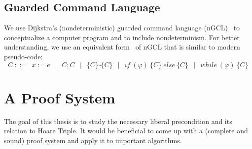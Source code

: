 \documentclass[adraft,hidelinks]{eptcs}
\begin{document}
\subsection{Guarded Command Language}
We use Dijkstra's (nondeterministic) guarded command language (nGCL)~\cite{Dijkstra1975} to conceptualize a computer program and to include nondeterminism. 
For better understanding, we use an equivalent form~\cite{Zhang2022} of nGCL that is similar to modern pseudo-code: 
$$C\ ::=\ \  x:= e \ \ \mid\ \  C;C \ \ \mid\ \  \{C\} \square \{C\} \ \ \mid\ \  
if\ (\varphi)\ \{C\}\ else\ \{C\} \ \ \mid\ \  while\ (\varphi)\ \{C\}$$

\section{A Proof System}
The goal of this thesis is to study the necessary liberal precondition and its relation to Hoare Triple. 
It would be beneficial to come up with a (complete and sound) proof system and apply it to important algorithms. 








\end{document}
